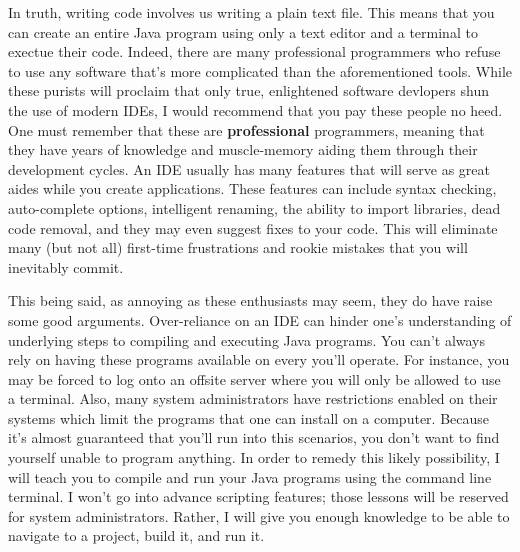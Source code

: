In truth, writing code involves us writing a plain text file.
This means that you can create an entire Java program using only a text editor and a terminal to exectue their code.
Indeed, there are many professional programmers who refuse to use any software that's more complicated than the aforementioned tools.
While these purists will proclaim that only true, enlightened software devlopers shun the use of modern \gls{IDE}s, I would recommend that you pay these people no heed.
One must remember that these are \textbf{professional} programmers, meaning that they have years of knowledge and muscle-memory aiding them through their development cycles.
An \gls{IDE} usually has many features that will serve as great aides while you create applications.
These features can include syntax checking, auto-complete options, intelligent renaming, the ability to import libraries, dead code removal, and they may even suggest fixes to your code.
This will eliminate many (but not all) first-time frustrations and rookie mistakes that you will inevitably commit.

This being said, as annoying as these enthusiasts may seem, they do have raise some good arguments.
Over-reliance on an IDE can hinder one's understanding of underlying steps to compiling and executing Java programs.
You can't always rely on having these programs available on every you'll operate.
For instance, you may be forced to log onto an offsite server where you will only be allowed to use a terminal.
Also, many system administrators have restrictions enabled on their systems which limit the programs that one can install on a computer.
Because it's almost guaranteed that you'll run into this scenarios, you don't want to find yourself unable to program anything.
In order to remedy this likely possibility, I will teach you to compile and run your Java programs using the command line terminal.
I won't go into advance scripting features; those lessons will be reserved for system administrators.
Rather, I will give you enough knowledge to be able to navigate to a project, build it, and run it.




